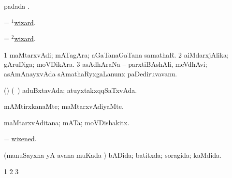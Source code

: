 \bentry
{} 
\gl{\nA}
\expl{}
\bmng
{} padada \bava. 
\emng
\eentry

\bentry
{} 
\gl{\nA}
\expl{}
\bmng
= \hyperlink{wizard(1)}{$^1$wizard}. 
\emng
\eentry

\bentry
{}
\gl{\gu}
\expl{}
\bmng
= \hyperlink{wizard(2)}{$^2$wizard}. 
\emng
\eentry

\bentry
{} 
\gl{\nA}
\expl{}
\bmng
\bnum
\num{1} maMtarxvAdi; mATagAra; aGaTanaGaTana samathaR. 
\num{2} aiMdarxjAlika; gAruDiga; moVDikAra. 
\num{3} asAdhAraNa -- parxtiBAshAli, meVdhAvi; asAmAnayxvAda sAmathaRyxgaLanunx paDediruvavanu. 
\enum
\emng
\eentry

\bentry
{} 
\gl{\gu}
\expl{}
\bmng
(\ashi) (\kanmu\ \birx) aduBxtavAda; atuyxtakxqqSaTxvAda. 
\emng
\eentry

\bentry
{} 
\gl{\kirxvi}
\expl{}
\bmng
mAMtirxkanaMte; maMtarxvAdiyaMte. 
\emng
\eentry

\bentry
{} 
\gl{\nA}
\expl{}
\bmng
maMtarxvAditana; mATa; moVDishakitx. 
\emng
\eentry

\bentry
{} 
\gl{\gu}
\expl{}
\bmng
= \hyperlink{wizened}{wizened}. 
\emng
\eentry

\bentry
{} 
\gl{\gu}
\expl{}
\bmng
(manuSayxna yA avana muKada \vi) bADida; batitxda; soragida; kaMdida. 
\emng
\eentry

\bentry
{} 
\gl{\saMkiSx}
\expl{}
\bmng
\bnum
\num{1}  
\num{2}  
\num{3}  
\enum
\emng
\eentry

\bentry
{} 
\gl{\saMkiSx}
\expl{}
\bmng
{} 
\emng
\eentry

\bentry
{} 
\gl{\saMkiSx}
\expl{}
\bmng
{} 
\emng
\eentry

\bentry
{} 
\gl{\saMkiSx}
\expl{}
\bmng
{} 
\emng
\eentry

\bentry
{} 
\gl{\saMkiSx}
\expl{}
\bmng
{} 
\emng
\eentry

\bentry
{} 
\gl{\saMkiSx}
\expl{}
\bmng
{} 
\emng
\eentry

